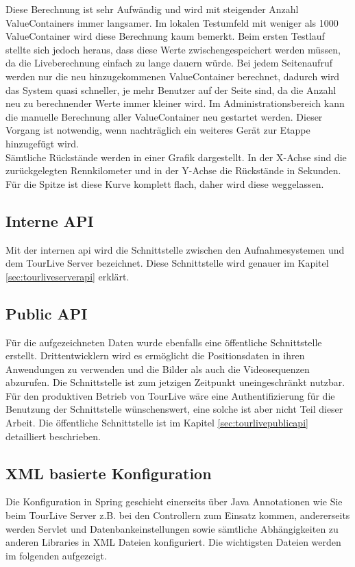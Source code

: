 Diese Berechnung ist sehr Aufwändig und wird mit steigender Anzahl ValueContainers immer langsamer. Im lokalen Testumfeld mit weniger als 1000 ValueContainer wird diese Berechnung kaum bemerkt. Beim ersten Testlauf stellte sich jedoch heraus, dass diese Werte zwischengespeichert werden müssen, da die Liveberechnung einfach zu lange dauern würde. Bei jedem Seitenaufruf werden nur die neu hinzugekommenen ValueContainer berechnet, dadurch wird das System quasi schneller, je mehr Benutzer auf der Seite sind, da die Anzahl neu zu berechnender Werte immer kleiner wird. Im Administrationsbereich kann die manuelle Berechnung aller ValueContainer neu gestartet werden. Dieser Vorgang ist notwendig, wenn nachträglich ein weiteres Gerät zur Etappe hinzugefügt wird.
\\

Sämtliche Rückstände werden in einer Grafik dargestellt. In der X-Achse sind die zurückgelegten Rennkilometer und in der Y-Achse die Rückstände in Sekunden. Für die Spitze ist diese Kurve komplett flach, daher wird diese weggelassen.


\subsection{Interne API}
Mit der internen \gls{api} wird die Schnittstelle zwischen den Aufnahmesystemen und dem TourLive Server bezeichnet. Diese Schnittstelle wird genauer im Kapitel \ref{sec:tourliveserverapi} erklärt.

\subsection{Public API}
Für die aufgezeichneten Daten wurde ebenfalls eine öffentliche Schnittstelle erstellt. Drittentwicklern wird es ermöglicht die Positionsdaten in ihren Anwendungen zu verwenden und die Bilder als auch die Videosequenzen abzurufen. Die Schnittstelle ist zum jetzigen Zeitpunkt uneingeschränkt nutzbar. Für den produktiven Betrieb von TourLive wäre eine Authentifizierung für die Benutzung der Schnittstelle wünschenswert, eine solche ist aber nicht Teil dieser Arbeit. Die öffentliche Schnittstelle ist im Kapitel \ref{sec:tourlivepublicapi} detailliert beschrieben.

\subsection{XML basierte Konfiguration}
Die Konfiguration in Spring geschieht einerseits über Java Annotationen wie Sie beim TourLive Server z.B. bei den Controllern zum Einsatz kommen, andererseits werden Servlet und Datenbankeinstellungen sowie sämtliche Abhängigkeiten zu anderen Libraries in XML Dateien konfiguriert. Die wichtigsten Dateien werden im folgenden aufgezeigt.

